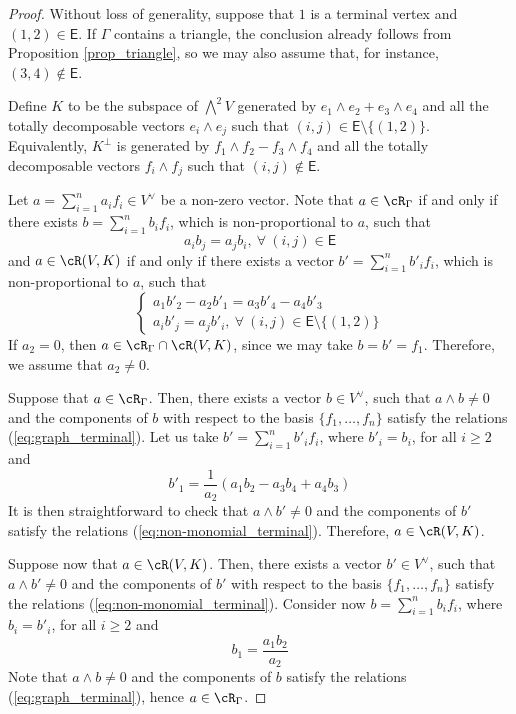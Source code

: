 \documentclass[10pt, leqno]{amsart}
\begin{document}
\begin{proof}
Without loss of generality, suppose that $1$ is a terminal vertex and $(1,2) \in \mathsf{E}$. If $\Gamma$ contains a triangle, the conclusion already follows from Proposition \ref{prop_triangle}, so we may also assume that, for instance, $(3,4) \notin \mathsf{E}$.

Define $K$ to be the subspace of $\bigwedge^2V$ generated by $e_1 \wedge e_2 + e_3 \wedge e_4$ and all the totally decomposable vectors $e_i \wedge e_j$ such that $(i,j) \in \mathsf{E} \setminus \{(1,2)\}$. Equivalently, $K^\perp$ is generated by $f_1 \wedge f_2 - f_3 \wedge f_4$ and all the totally decomposable vectors $f_i \wedge f_j$ such that $(i,j) \notin \mathsf{E}$.

Let $a  = \sum_{i=1}^n a_i f_i \in V^\vee$ be a non-zero vector. Note that $a \in \cR_\Gamma$ if and only if there exists $b = \sum_{i=1}^n b_i f_i$, which is non-proportional to $a$, such that
\begin{equation} \label{eq:graph_terminal}
    a_i b_j = a_j b_i, \ \forall \ (i,j) \in \mathsf{E}
\end{equation}
and $a \in \cR(V,K)$ if and only if there exists a vector $b' = \sum_{i=1}^n b'_i f_i$, which is non-proportional to $a$, such that
\begin{equation} \label{eq:non-monomial_terminal}
    \begin{cases}
        a_1 b'_2 - a_2 b'_1 = a_3 b'_4 - a_4 b'_3 \\
        a_i b'_j = a_j b'_i, \ \forall \ (i,j) \in \mathsf{E}\setminus \{(1,2)\}
    \end{cases}
\end{equation}
If $a_2 = 0$, then $a \in \cR_\Gamma \cap \cR(V,K)$, since we may take $b = b' = f_1$. Therefore, we assume that $a_2 \neq 0$.

Suppose that $a \in \cR_\Gamma$. Then, there exists a vector $b \in V^\vee$, such that $a \wedge b \neq 0$ and the components of $b$ with respect to the basis $\{f_1, \ldots, f_n\}$ satisfy the relations (\ref{eq:graph_terminal}). Let us take $b' = \sum_{i=1}^n b'_i f_i$, where $b'_i = b_i$, for all $i \ge 2$ and
\[
b'_1 = \frac{1}{a_2}(a_1 b_2 - a_3 b_4 + a_4 b_3)
\]
It is then straightforward to check that $a \wedge b' \neq 0$ and the components of $b'$ satisfy the relations (\ref{eq:non-monomial_terminal}). Therefore, $a \in \cR(V,K)$.

Suppose now that $a \in \cR(V,K)$. Then, there exists a vector $b' \in V^\vee$, such that $a \wedge b' \neq 0$ and the components of $b'$ with respect to the basis $\{f_1, \ldots, f_n\}$ satisfy the relations (\ref{eq:non-monomial_terminal}). Consider now $b = \sum_{i=1}^n b_i f_i$, where $b_i = b'_i$, for all $i \ge 2$ and
\[
b_1 = \frac{a_1 b_2}{a_2}
\]
Note that $a \wedge b \neq 0$ and the components of $b$ satisfy the relations (\ref{eq:graph_terminal}), hence $a \in \cR_\Gamma$.
\end{proof}
\end{document}
